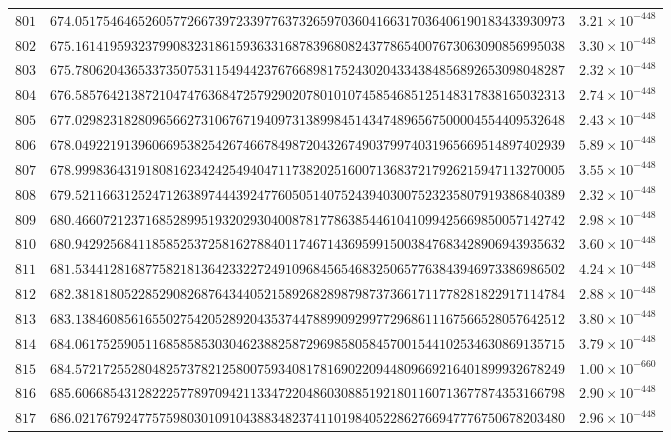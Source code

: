 \documentclass[12pt,reqno]{amsart}
\theoremstyle{remark}
\begin{document}
\begin{longtable}{clc}
$801$ & $674.0517546465260577266739723397763732659703604166317036406190183433930973$ & $3.21\times 10^{-448}$ \\
$802$ & $675.1614195932379908323186159363316878396808243778654007673063090856995038$ & $3.30\times 10^{-448}$ \\
$803$ & $675.7806204365337350753115494423767668981752430204334384856892653098048287$ & $2.32\times 10^{-448}$ \\
$804$ & $676.5857642138721047476368472579290207801010745854685125148317838165032313$ & $2.74\times 10^{-448}$ \\
$805$ & $677.0298231828096566273106767194097313899845143474896567500004554409532648$ & $2.43\times 10^{-448}$ \\
$806$ & $678.0492219139606695382542674667849872043267490379974031965669514897402939$ & $5.89\times 10^{-448}$ \\
$807$ & $678.9998364319180816234242549404711738202516007136837217926215947113270005$ & $3.55\times 10^{-448}$ \\
$808$ & $679.5211663125247126389744439247760505140752439403007523235807919386840389$ & $2.32\times 10^{-448}$ \\
$809$ & $680.4660721237168528995193202930400878177863854461041099425669850057142742$ & $2.98\times 10^{-448}$ \\
$810$ & $680.9429256841185852537258162788401174671436959915003847683428906943935632$ & $3.60\times 10^{-448}$ \\
$811$ & $681.5344128168775821813642332272491096845654683250657763843946973386986502$ & $4.24\times 10^{-448}$ \\
$812$ & $682.3818180522852908268764344052158926828987987373661711778281822917114784$ & $2.88\times 10^{-448}$ \\
$813$ & $683.1384608561655027542052892043537447889909299772968611167566528057642512$ & $3.80\times 10^{-448}$ \\
$814$ & $684.0617525905116858585303046238825872969858058457001544102534630869135715$ & $3.79\times 10^{-448}$ \\
$815$ & $684.5721725528048257378212580075934081781690220944809669216401899932678249$ & $1.00\times 10^{-660}$ \\
$816$ & $685.6066854312822257789709421133472204860308851921801160713677874353166798$ & $2.90\times 10^{-448}$ \\
$817$ & $686.0217679247757598030109104388348237411019840522862766947776750678203480$ & $2.96\times 10^{-448}$ \\

\end{longtable}
\end{document}
